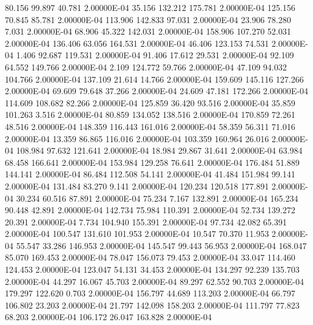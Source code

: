     80.156    99.897    40.781  2.00000E-04
    35.156   132.212   175.781  2.00000E-04
   125.156    70.845    85.781  2.00000E-04
   113.906   142.833    97.031  2.00000E-04
    23.906    78.280     7.031  2.00000E-04
    68.906    45.322   142.031  2.00000E-04
   158.906   107.270    52.031  2.00000E-04
   136.406    63.056   164.531  2.00000E-04
    46.406   123.153    74.531  2.00000E-04
     1.406    92.687   119.531  2.00000E-04
    91.406    17.612    29.531  2.00000E-04
    92.109    64.552   149.766  2.00000E-04
     2.109   124.772    59.766  2.00000E-04
    47.109    94.032   104.766  2.00000E-04
   137.109    21.614    14.766  2.00000E-04
   159.609   145.116   127.266  2.00000E-04
    69.609    79.648    37.266  2.00000E-04
    24.609    47.181   172.266  2.00000E-04
   114.609   108.682    82.266  2.00000E-04
   125.859    36.420    93.516  2.00000E-04
    35.859   101.263     3.516  2.00000E-04
    80.859   134.052   138.516  2.00000E-04
   170.859    72.261    48.516  2.00000E-04
   148.359   116.443   161.016  2.00000E-04
    58.359    56.311    71.016  2.00000E-04
    13.359    86.865   116.016  2.00000E-04
   103.359   160.964    26.016  2.00000E-04
   108.984    97.632   121.641  2.00000E-04
    18.984    29.867    31.641  2.00000E-04
    63.984    68.458   166.641  2.00000E-04
   153.984   129.258    76.641  2.00000E-04
   176.484    51.889   144.141  2.00000E-04
    86.484   112.508    54.141  2.00000E-04
    41.484   151.984    99.141  2.00000E-04
   131.484    83.270     9.141  2.00000E-04
   120.234   120.518   177.891  2.00000E-04
    30.234    60.516    87.891  2.00000E-04
    75.234     7.167   132.891  2.00000E-04
   165.234    90.448    42.891  2.00000E-04
   142.734    75.984   110.391  2.00000E-04
    52.734   139.272    20.391  2.00000E-04
     7.734   104.940   155.391  2.00000E-04
    97.734    42.082    65.391  2.00000E-04
   100.547   131.610   101.953  2.00000E-04
    10.547    70.370    11.953  2.00000E-04
    55.547    33.286   146.953  2.00000E-04
   145.547    99.443    56.953  2.00000E-04
   168.047    85.070   169.453  2.00000E-04
    78.047   156.073    79.453  2.00000E-04
    33.047   114.460   124.453  2.00000E-04
   123.047    54.131    34.453  2.00000E-04
   134.297    92.239   135.703  2.00000E-04
    44.297    16.067    45.703  2.00000E-04
    89.297    62.552    90.703  2.00000E-04
   179.297   122.620     0.703  2.00000E-04
   156.797    44.689   113.203  2.00000E-04
    66.797   106.802    23.203  2.00000E-04
    21.797   142.098   158.203  2.00000E-04
   111.797    77.823    68.203  2.00000E-04
   106.172    26.047   163.828  2.00000E-04
